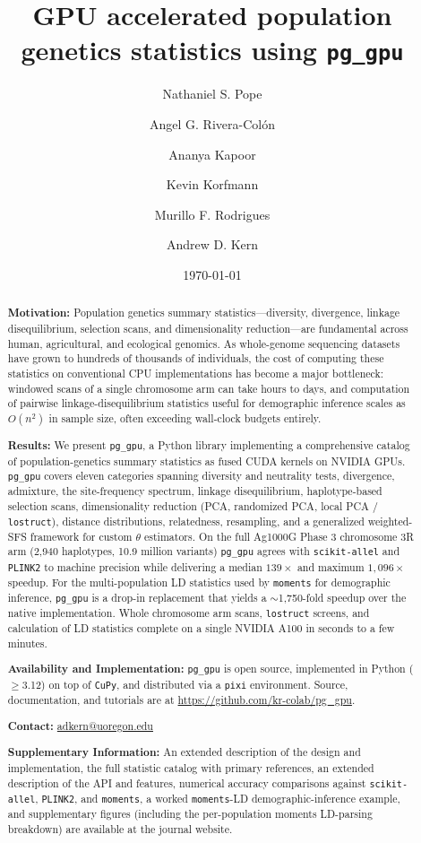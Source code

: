 \documentclass[12pt]{article}
\title{GPU accelerated population genetics statistics using \texttt{pg\_gpu}}
\author[1, 2]{Nathaniel S. Pope}
\author[1, 2]{Angel G. Rivera-Col\'{o}n}
\author[1, 2]{Ananya Kapoor}
\author[3]{Kevin Korfmann}
\author[4]{Murillo F. Rodrigues}
\author[1, 2, *]{Andrew D. Kern}
\affil[1]{\small{Institute of Ecology and Evolution, University of Oregon}}
\affil[2]{\small{Department of Biology, University of Oregon}}
\affil[3]{\small{Department of Biology, University of Pennsylvania}}
\affil[4]{\small{Oregon National Primate Research Center, Oregon Health \& Science University}}
\affil[*]{\small{Corresponding author: \href{mailto:adkern@uoregon.edu}{adkern@uoregon.edu}}}
\date{\small{\today{}}}
\newcommand{\pggpu}{\texttt{pg\_gpu}\xspace}
\newcommand{\scikitallel}{\texttt{scikit-allel}\xspace}
\newcommand{\plinktwo}{\texttt{PLINK2}\xspace}
\newcommand{\moments}{\texttt{moments}\xspace}
\newcommand{\cupy}{\texttt{CuPy}\xspace}
\newcommand{\pixi}{\texttt{pixi}\xspace}
\newcommand{\lostruct}{\texttt{lostruct}\xspace}
\begin{document}
\maketitle

\begin{abstract}
\noindent\textbf{Motivation:} Population genetics summary
statistics---diversity, divergence, linkage disequilibrium, selection
scans, and dimensionality reduction---are fundamental across human,
agricultural, and ecological genomics. As whole-genome sequencing
datasets have grown to hundreds of thousands of individuals, the
cost of computing these statistics on conventional CPU implementations has
become a major bottleneck: windowed scans of a single chromosome arm
can take hours to days, and computation of pairwise linkage-disequilibrium
statistics useful for demographic inference scales as $O(n^2)$ in
sample size, often exceeding wall-clock budgets entirely.

\noindent\textbf{Results:} We present \pggpu, a Python library
implementing a comprehensive catalog of population-genetics summary
statistics as fused CUDA kernels on NVIDIA GPUs. \pggpu covers eleven
categories spanning diversity and neutrality tests, divergence,
admixture, the site-frequency spectrum, linkage disequilibrium,
haplotype-based selection scans, dimensionality reduction (PCA,
randomized PCA, local PCA / \lostruct), distance distributions,
relatedness, resampling, and a generalized weighted-SFS framework for
custom $\theta$ estimators. On the full Ag1000G Phase 3 chromosome 3R
arm (2{,}940 haplotypes, 10.9 million variants) \pggpu agrees with
\scikitallel and \plinktwo to machine precision while delivering a
median $139\times$ and maximum $1{,}096\times$ speedup. For
the multi-population LD statistics used by \moments for demographic inference,
\pggpu is a drop-in replacement that yields a $\sim$1{,}750-fold
speedup over the native implementation. Whole chromosome arm scans, \lostruct screens, and calculation 
of LD statistics complete on a single NVIDIA A100 in
seconds to a few minutes.

\noindent\textbf{Availability and Implementation:} \pggpu is open
source, implemented in Python ($\geq$3.12) on top of \cupy, and
distributed via a \pixi environment. Source, documentation, and
tutorials are at \url{https://github.com/kr-colab/pg_gpu}.

\noindent\textbf{Contact:} \href{mailto:adkern@uoregon.edu}{adkern@uoregon.edu}

\noindent\textbf{Supplementary Information:} An extended description of
the design and implementation, the full statistic catalog with primary
references, an extended description of the API and features, numerical
accuracy comparisons against \scikitallel, \plinktwo, and \moments, a
worked \moments-LD demographic-inference example, and supplementary
figures (including the per-population moments LD-parsing breakdown) are
available at the journal website.
\end{abstract}
\end{document}
